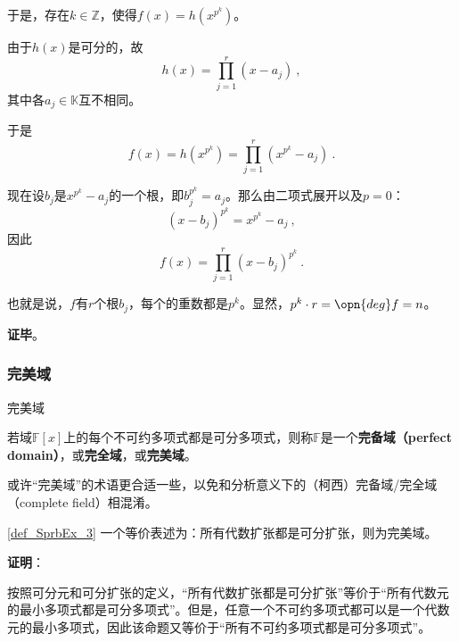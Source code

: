 于是，存在$k\in\mathbb{Z}$，使得$f(x) = h(x^{p^k})$。

由于$h(x)$是可分的，故
\begin{equation}
h(x) = \prod_{j=1}^{r}(x-a_j)~,
\end{equation}
其中各$a_j\in\mathbb{K}$互不相同。

于是
\begin{equation}
f(x) = h(x^{p^k}) = \prod_{j=1}^{r}(x^{p^k}-a_j)~.
\end{equation}

现在设$b_j$是$x^{p^k}-a_j$的一个根，即$b_j^{p^k}=a_j$。那么由二项式展开以及$p=0$：
\begin{equation}
(x-b_j)^{p^k} = x^{p^k}-a_j~,
\end{equation}
因此
\begin{equation}
f(x) = \prod_{j=1}^{r} (x-b_j)^{p^k}~.
\end{equation}

也就是说，$f$有$r$个根$b_j$，每个的重数都是$p^k$。显然，$p^k\cdot r = \opn{deg}f = n$。

\textbf{证毕}。










\subsubsection{完美域}


\begin{definition}{完美域}\label{def_SprbEx_3}

若域$\mathbb{F}[x]$上的每个不可约多项式都是可分多项式，则称$\mathbb{F}$是一个\textbf{完备域（perfect domain）}，或\textbf{完全域}，或\textbf{完美域}。


\end{definition}


或许“完美域”的术语更合适一些，以免和分析意义下的（柯西）完备域/完全域（complete field）相混淆。

\begin{theorem}{}\label{the_SprbEx_5}
\autoref{def_SprbEx_3} 一个等价表述为：所有代数扩张都是可分扩张，则为完美域。
\end{theorem}




\textbf{证明}：

按照可分元和可分扩张的定义，“所有代数扩张都是可分扩张”等价于“所有代数元的最小多项式都是可分多项式”。但是，任意一个不可约多项式都可以是一个代数元的最小多项式，因此该命题又等价于“所有不可约多项式都是可分多项式”。

